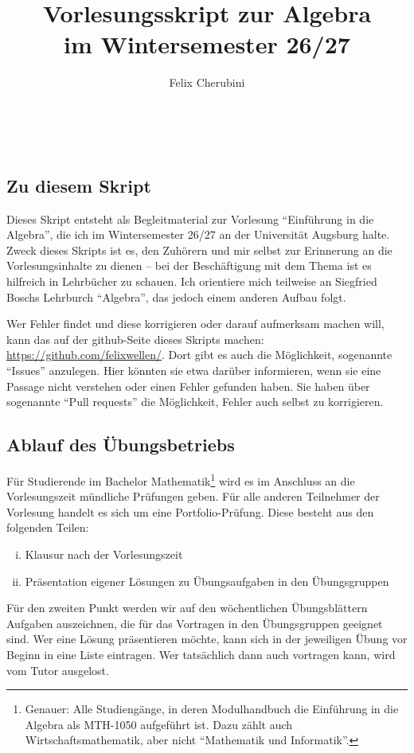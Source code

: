 \documentclass{../util/algebra}
\title{Vorlesungsskript zur Algebra \\ im Wintersemester 26/27}
\author{Felix Cherubini}
\begin{document}
\maketitle

\tableofcontents

\vspace{1cm}~\\

\subsection*{Zu diesem Skript}

Dieses Skript entsteht als Begleitmaterial zur Vorlesung ``Einführung in die Algebra'', die ich im Win\-ter\-se\-mester 26/27 an der Universität Augsburg halte.
Zweck dieses Skripts ist es, den Zuhörern und mir selbst zur Erinnerung an die Vorlesungsinhalte zu dienen --
bei der Beschäftigung mit dem Thema ist es hilfreich in Lehrbücher zu schauen.
Ich orientiere mich teilweise an Siegfried Boschs Lehrburch ``Algebra'', das jedoch einem anderen Aufbau folgt.

Wer Fehler findet und diese korrigieren oder darauf aufmerksam machen will, kann das auf der github-Seite dieses Skripts machen:
\href{https://github.com/felixwellen/}{https://github.com/felixwellen/}.
Dort gibt es auch die Möglichkeit, sogenannte ``Issues'' anzulegen.
Hier könnten sie etwa darüber informieren, wenn sie eine Passage nicht verstehen oder einen Fehler gefunden haben.
Sie haben über sogenannte ``Pull requests'' die Möglichkeit, Fehler auch selbst zu korrigieren.

\subsection*{Ablauf des Übungsbetriebs}

Für Studierende im Bachelor Mathematik\footnote{Genauer: Alle Studiengänge, in deren Modulhandbuch die Einführung in die Algebra als MTH-1050 aufgeführt ist. Dazu zählt auch Wirtschaftsmathematik, aber nicht ``Mathematik und Informatik''.} wird es im Anschluss an die Vorlesungszeit mündliche Prüfungen geben.
Für alle anderen Teilnehmer der Vorlesung handelt es sich um eine Portfolio-Prüfung. Diese besteht aus den folgenden Teilen:
\begin{enumerate}[(i)]
\item Klausur nach der Vorlesungszeit
\item Präsentation eigener Lösungen zu Übungsaufgaben in den Übungsgruppen
\end{enumerate}
Für den zweiten Punkt werden wir auf den wöchentlichen Übungsblättern Aufgaben auszeichnen, die für das Vortragen in den Übungsgruppen geeignet sind. Wer eine Lösung präsentieren möchte, kann sich in der jeweiligen Übung vor Beginn in eine Liste eintragen. Wer tatsächlich dann auch vortragen kann, wird vom Tutor ausgelost.
\end{document}
